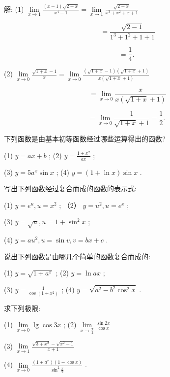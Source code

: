 \documentclass[lang=cn,newtx,12pt,scheme=chinese]{elegantbook}
\begin{document}
解: (1) \(\mathop{\lim }\limits_{{x \rightarrow 1}}\frac{\left( {x - 1}\right) \sqrt{2 - x}}{{x}^{4} - 1} = \mathop{\lim }\limits_{{x \rightarrow 1}}\frac{\sqrt{2 - x}}{{x}^{3} + {x}^{2} + x + 1}\)

\[
= \frac{\sqrt{2 - 1}}{{1}^{3} + {1}^{2} + 1 + 1}
\]

\[
= \frac{1}{4}\text{. }
\]

(2) \(\mathop{\lim }\limits_{{x \rightarrow 0}}\frac{\sqrt{1 + x} - 1}{x} = \mathop{\lim }\limits_{{x \rightarrow 0}}\frac{\left( {\sqrt{1 + x} - 1}\right) \left( {\sqrt{1 + x} + 1}\right) }{x\left( {\sqrt{1 + x} + 1}\right) }\)

\[
= \mathop{\lim }\limits_{{x \rightarrow 0}}\frac{x}{x\left( {\sqrt{1 + x} + 1}\right) }
\]

\[
= \mathop{\lim }\limits_{{x \rightarrow 0}}\frac{1}{\sqrt{1 + x} + 1} = \frac{1}{2}\text{. }
\]

\begin{problemset}[练习]

\item 下列函数是由基本初等函数经过哪些运算得出的函数?

(1) \(y = {ax} + b\) ; (2) \(y = \frac{1 + {x}^{2}}{ax}\) ;

(3) \(y = 5{a}^{x}\sin x\) ; (4) \(y = \left( {1 + \ln x}\right) \sin x\) .

\item 写出下列函数经过复合而成的函数的表示式:

(1) \(y = {e}^{u},u = {x}^{2}\) ; （2） \(y = {u}^{2},u = {e}^{x}\) ;

(3) \(y = \sqrt{u},u = 1 + {\sin }^{2}x\) ;

(4) \(y = a{u}^{2},u = \sin v,v = {bx} + c\) .

\item 说出下列函数是由哪几个简单的函数复合而成的:

(1) \(y = \sqrt{1 + {a}^{x}}\) ; (2) \(y = \ln {ax}\) ;

(3) \(y = \frac{1}{\cos \left( {1 + {x}^{2}}\right) }\) ; (4) \(y = \sqrt{{a}^{2} - {b}^{2}{\cos }^{2}x}\) .

\item 求下列极限:

(1) \(\mathop{\lim }\limits_{{x \rightarrow 0}}\lg \cos {3x}\) ; (2) \(\mathop{\lim }\limits_{{x \rightarrow \frac{\pi }{2}}}\frac{\sin {2x}}{\cos x}\)

(3) \(\mathop{\lim }\limits_{{x \rightarrow 1}}\frac{\sqrt{3 + {x}^{2}} - \sqrt{{x}^{2} - 1}}{x + 1}\)

(4) \(\mathop{\lim }\limits_{{x \rightarrow 0}}\frac{\left( {1 + {a}^{x}}\right) \left( {1 - \cos x}\right) }{{\sin }^{2}\frac{x}{2}}\) .

\end{problemset}
\end{document}

